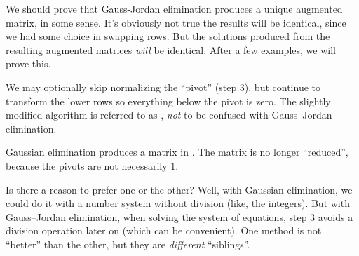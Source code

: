 \begin{remark}
We should prove that Gauss-Jordan elimination produces a unique
augmented matrix, in some sense. It's obviously not true the results
will be identical, since we had some choice in swapping rows. But the
solutions produced from the resulting augmented matrices \emph{will} be
identical. After a few examples, we will prove this.
\end{remark}

We may optionally skip normalizing the ``pivot'' (step 3), but continue
to transform the lower rows so everything below the pivot is zero. The
slightly modified algorithm is referred to as ,
\emph{not} to be confused with Gauss--Jordan elimination.

Gaussian elimination produces a matrix in .
The matrix is no longer ``reduced'', because the pivots are not
necessarily $1$.

Is there a reason to prefer one or the other? Well, with Gaussian
elimination, we could do it with a number system without division (like,
the integers). But with Gauss--Jordan elimination, when solving the
system of equations, step 3 avoids a division operation later on (which
can be convenient). One method is not ``better'' than the other, but
they are \emph{different} ``siblings''.

